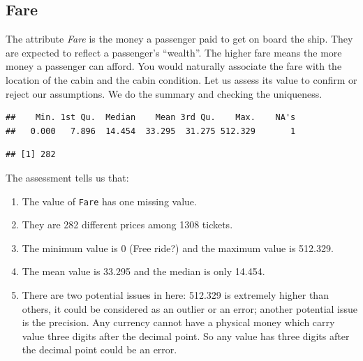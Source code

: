\documentclass[
]{book}
\newenvironment{Shaded}{\begin{snugshade}}{\end{snugshade}}
\newcommand{\KeywordTok}[1]{\textcolor[rgb]{0.13,0.29,0.53}{\textbf{#1}}}
\newcommand{\NormalTok}[1]{#1}
\newcommand{\OperatorTok}[1]{\textcolor[rgb]{0.81,0.36,0.00}{\textbf{#1}}}
\providecommand{\tightlist}{%
  \setlength{\itemsep}{0pt}\setlength{\parskip}{0pt}}
\begin{document}
\hypertarget{fare}{%
\subsection*{Fare}\label{fare}}


The attribute \emph{Fare} is the money a passenger paid to get on board the ship. They are expected to reflect a passenger's ``wealth''. The higher fare means the more money a passenger can afford. You would naturally associate the fare with the location of the cabin and the cabin condition. Let us assess its value to confirm or reject our assumptions. We do the summary and checking the uniqueness.

\begin{Shaded}
\end{Shaded}

\begin{verbatim}
##    Min. 1st Qu.  Median    Mean 3rd Qu.    Max.    NA's 
##   0.000   7.896  14.454  33.295  31.275 512.329       1
\end{verbatim}

\begin{Shaded}
\end{Shaded}

\begin{verbatim}
## [1] 282
\end{verbatim}

The assessment tells us that:

\begin{enumerate}
\def\labelenumi{\arabic{enumi}.}
\tightlist
\item
  The value of \texttt{Fare} has one missing value.
\item
  They are 282 different prices among 1308 tickets.
\item
  The minimum value is 0 (Free ride?) and the maximum value is 512.329.
\item
  The mean value is 33.295 and the median is only 14.454.
\item
  There are two potential issues in here: 512.329 is extremely higher than others, it could be considered as an outlier or an error; another potential issue is the precision. Any currency cannot have a physical money which carry value three digits after the decimal point. So any value has three digits after the decimal point could be an error.
\end{enumerate}
\end{document}
